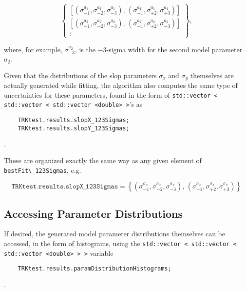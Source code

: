 \documentclass[12pt]{article}
\newcommand{\li}{\lstinline}
\begin{document}
\begin{equation}
    \begin{Bmatrix}
        \left[\left(\sigma_{-1}^{a_1}, \sigma_{-2}^{a_1}, \sigma_{-3}^{a_1}\right), \, \left(\sigma_{+1}^{a_1}, \sigma_{+2}^{a_1}, \sigma_{+3}^{a_1}\right)\right] \\
        \left[\left(\sigma_{-1}^{a_2}, \sigma_{-2}^{a_2}, \sigma_{-3}^{a_2}\right), \, \left(\sigma_{+1}^{a_2}, \sigma_{+2}^{a_2}, \sigma_{+3}^{a_2}\right)\right] \\
        \vdots
    \end{Bmatrix},
\end{equation}

where, for example, $\sigma_{-3}^{a_2}$, is the $-3$-sigma width for the second model parameter $a_2$.

Given that the distributions of the slop parameters $\sigma_x$ and $\sigma_y$ themselves are actually generated while fitting, the algorithm also computes the same type of uncertainties for these parameters, found in the form of \li{std::vector < std::vector < std::vector <double> >}'s as

\begin{lstlisting}
    TRKtest.results.slopX_123Sigmas;
    TRKtest.results.slopY_123Sigmas;
\end{lstlisting}.

These are organized exactly the same way as any given element of \li{bestFit\_123Sigmas}, e.g.

\begin{equation}
    \texttt{TRKtest.results.slopX\_123Sigmas} = \left\{\left(\sigma_{-1}^{\sigma_x}, \sigma_{-2}^{\sigma_x}, \sigma_{-3}^{\sigma_x}\right), \, \left(\sigma_{+1}^{\sigma_x}, \sigma_{+2}^{\sigma_x}, \sigma_{+3}^{\sigma_x}\right)\right\}
\end{equation}

\subsection{Accessing Parameter Distributions}

If desired, the generated model parameter distributions themselves can be accessed, in the form of histograms, using the \li{std::vector < std::vector < std::vector <double> > >} variable

\begin{lstlisting}
    TRKtest.results.paramDistributionHistograms;
\end{lstlisting}.
\end{document}
